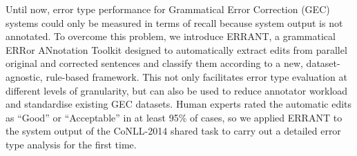 Until now, error type performance for Grammatical Error Correction (GEC) systems could only be measured in terms of recall because system output is not annotated. To overcome this problem, we introduce ERRANT, a grammatical ERRor ANnotation Toolkit designed to automatically extract edits from parallel original and corrected sentences and classify them according to a new, dataset-agnostic, rule-based framework. This not only facilitates error type evaluation at different levels of granularity, but can also be used to reduce annotator workload and standardise existing GEC datasets. Human experts rated the automatic edits as ``Good'' or ``Acceptable'' in at least 95\% of cases, so we applied ERRANT to the system output of the CoNLL-2014 shared task to carry out a detailed error type analysis for the first time.
